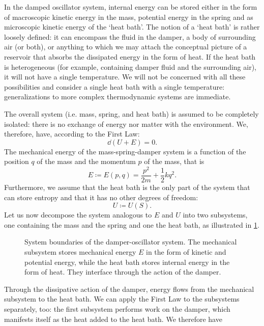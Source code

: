 In the damped oscillator system, internal energy can be stored either in the form of macroscopic kinetic energy in the mass, potential energy in the spring and as microscopic kinetic energy of the `heat bath'. The notion of a `heat bath' is rather loosely defined: it can encompass the fluid in the damper, a body of surrounding air (or both), or anything to which we may attach the conceptual picture of a reservoir that absorbs the dissipated energy in the form of heat. If the heat bath is heterogeneous (for example, containing damper fluid and the surrounding air), it will not have a single temperature. We will not be concerned with all these possibilities and consider a single heat bath with a single temperature: generalizations to more complex thermodynamic systems are immediate.

The overall system (i.e. mass, spring, and heat bath) is assumed to be completely isolated: there is no exchange of energy nor matter with the environment. We, therefore, have, according to the First Law:
\begin{equation}
    \dd{(U + E)} = 0. 
    \label{eq:dho_first_law}
\end{equation}
The mechanical energy of the mass-spring-damper system is a function of the position $q$ of the mass and the momentum $p$ of the mass, that is
\begin{equation}
    E \coloneq E(p, q) = \frac{p^2}{2m} + \frac{1}{2}kq^2. 
    \label{eq:dho_mech_energy}
\end{equation}
Furthermore, we assume that the heat bath is the only part of the system that can store entropy and that it has no other degrees of freedom:
\begin{equation}
    U \coloneq U(S).  
    \label{eq:dho_int_energy}
\end{equation}
Let us now decompose the system analogous to $E$ and $U$ into two subsystems, one containing the mass and the spring and one the heat bath, as illustrated in \cref{fig:oscillator_thermo}. 
\begin{figure}[ht!]
    \centering
    
    \caption{System boundaries of the damper-oscillator system. The mechanical subsystem stores mechanical energy $E$ in the form of kinetic and potential energy, while the heat bath stores internal energy in the form of heat. They interface through the action of the damper.}
    \label{fig:oscillator_thermo}
\end{figure}
Through the dissipative action of the damper, energy flows from the mechanical subsystem to the heat bath. We can apply the First Law to the subsystems separately, too: the first subsystem performs work on the damper, which manifests itself as the heat added to the heat bath. We therefore have
